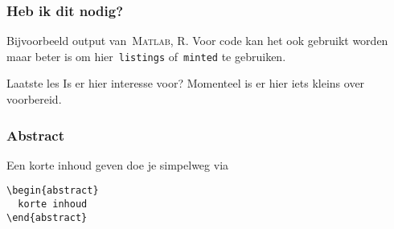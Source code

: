 
\begin{frame}[fragile]
  \frametitle{Heb ik dit nodig?}

  Bijvoorbeeld output van~\textsc{Matlab}, R. Voor code kan het ook gebruikt worden maar beter is om hier~\verb|listings| of~\verb|minted| te gebruiken.

  \pause\begin{exampleblock}{Laatste les}
    Is er hier interesse voor? Momenteel is er hier iets kleins over voorbereid.
  \end{exampleblock}
\end{frame}

\begin{frame}[fragile]
  \frametitle{Abstract}

  Een korte inhoud geven doe je simpelweg via
\begin{verbatim}
\begin{abstract}
  korte inhoud
\end{abstract}
\end{verbatim}
\end{frame}
